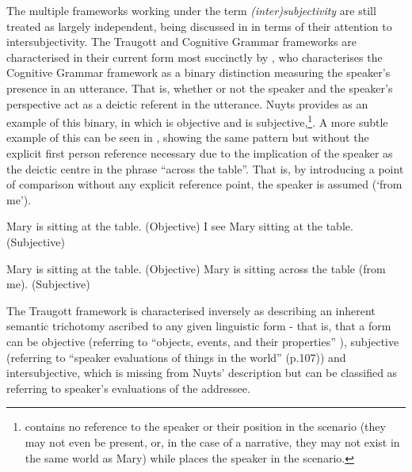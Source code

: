 The multiple frameworks working under the term \textit{(inter)subjectivity} are still treated as largely independent, being discussed in  in terms of their attention to intersubjectivity. The Traugott and Cognitive Grammar frameworks are characterised in their current form most succinctly by , who characterises the Cognitive Grammar framework as a binary distinction measuring the speaker's presence in an utterance. That is, whether or not the speaker and the speaker's perspective act as a deictic referent in the utterance. Nuyts provides  as an example of this binary, in which  is objective and  is subjective,\footnote{ contains no reference to the speaker or their position in the scenario (they may not even be present, or, in the case of a narrative, they may not exist in the same world as Mary) while  places the speaker in the scenario.}. A more subtle example of this can be seen in , showing the same pattern but without the explicit first person reference necessary due to the implication of the speaker as the deictic centre in the phrase ``across the table''. That is, by introducing a point of comparison without any explicit reference point, the speaker is assumed (`from me').

\begin{exe}
\ex\label{ex:LangackerNuyts1}
\begin{xlist}
\ex Mary is sitting at the table. (Objective)\label{ex:LangackerNuyts1:Obj}
\ex I see Mary sitting at the table. (Subjective)\label{ex:LangackerNuyts1:Subj}
\end{xlist}
\cite[107]{Nuyts2015}
\end{exe}

\begin{exe}
\ex\label{ex:MyLangackerNuyts}
\begin{xlist}
\ex Mary is sitting at the table. (Objective)
\ex Mary is sitting across the table (from me). (Subjective)
\end{xlist}
\end{exe}

The Traugott framework is characterised inversely as describing an inherent semantic trichotomy ascribed to any given linguistic form - that is, that a form can be objective (referring to ``objects, events, and their properties'' \cite[107]{Nuyts2015}), subjective (referring to ``speaker evaluations of things in the world'' (p.107)) and intersubjective, which is missing from Nuyts' description but can be classified as referring to speaker's evaluations of the addressee.


